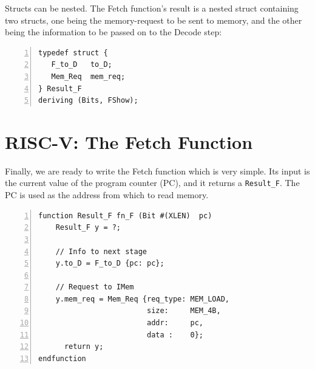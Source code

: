 
Structs can be nested.  The Fetch function's result is a nested struct
containing two structs, one being the memory-request to be sent to
memory, and the other being the information to be passed on to the
Decode step:

\begin{Verbatim}[frame=single, numbers=left]
typedef struct {
   F_to_D   to_D;
   Mem_Req  mem_req;
} Result_F
deriving (Bits, FShow);
\end{Verbatim}


\section{RISC-V: The Fetch Function}

\label{Sec_FSM_Fetch_Fn_F}

Finally, we are ready to write the Fetch function which is very
simple.  Its input is the current value of the program counter (PC),
and it returns a \verb|Result_F|.  The PC is used as the address from
which to read memory.

\begin{Verbatim}[frame=single, numbers=left]
function Result_F fn_F (Bit #(XLEN)  pc)
    Result_F y = ?;

    // Info to next stage
    y.to_D = F_to_D {pc: pc};

    // Request to IMem
    y.mem_req = Mem_Req {req_type: MEM_LOAD,
                         size:     MEM_4B,
                         addr:     pc,
                         data :    0};
      return y;
endfunction
\end{Verbatim}

